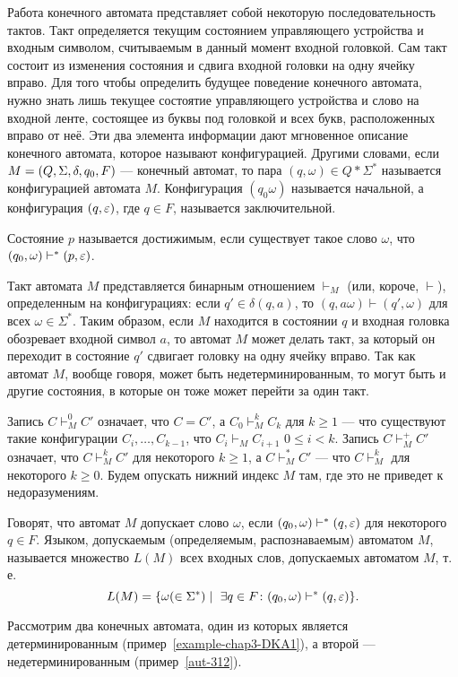 Работа конечного автомата представляет собой некоторую последовательность тактов. Такт определяется текущим состоянием управляющего устройства и входным символом, считываемым в данный момент входной головкой. Сам такт состоит из изменения состояния и сдвига входной головки на одну ячейку вправо. Для того чтобы определить будущее поведение конечного автомата, нужно знать лишь текущее состоятие управляющего устройства и слово на входной ленте, состоящее из буквы под головкой и всех букв, расположенных вправо от неё. Эти два элемента информации дают мгновенное описание конечного автомата, которое называют конфигурацией. Другими словами, если $M = (Q,\\ \Sigma, \delta, q_0, F)$ --- конечный автомат, то пара $(q,\omega)\in Q*\Sigma^*$ называется конфигурацией автомата $M$. Конфигурация $(q_0\omega)$ называется начальной, а конфигурация $(q,\varepsilon)$, где $q\in F$, называется заключительной.

Состояние $p$ называется достижимым, если существует такое слово $\omega$, что $(q_0,\omega)\vdash^*(p,\varepsilon)$.

Такт автомата $M$ представляется бинарным отношением $\vdash_M$ (или, короче, $\vdash$), определенным на конфигурациях: если $q'\in\delta(q,a)$, то $(q,a\omega)\vdash(q',\omega)$ для всех $\omega\in\Sigma^*$. Таким образом, если $M$ находится в состоянии $q$ и входная головка обозревает входной символ $a$, то автомат $M$ может делать такт, за который он переходит в состояние $q'$ сдвигает головку на одну ячейку вправо. Так как автомат $M$, вообще говоря, может быть недетерминированным, то могут быть и другие состояния, в которые он тоже может перейти за один такт.

Запись $C\vdash_M^0 C'$ означает, что $C=C'$, а $C_0\vdash_M^kC_k$ для $k\ge 1$ --- что существуют такие конфигурации $C_i, \ldots ,C_{k-1}$, что $C_i\vdash_MC_{i+1}$ $0\le i<k$. Запись $C\vdash_M^+C'$ означает, что $C\vdash_M^kC'$ для некоторого $k\ge 1$, а $C\vdash_M^*C'$ --- что $C\vdash_M^k$ для некоторого $k\ge 0$. Будем опускать нижний индекс $M$ там, где это не приведет к недоразумениям.

Говорят, что автомат $M$ допускает слово $\omega$, если $(q_0,\omega)\vdash^*(q,\varepsilon)$ для некоторого $q\in F$. Языком, допускаемым (определяемым, распознаваемым) автоматом $M$, называется множество $L(M)$ всех входных слов, допускаемых автоматом $M$, т. е.
\[
	L(M)=\{\omega(\in\Sigma^*)\mid~\exists q\in F\colon (q_0,\omega)\vdash^*(q,\varepsilon)\}.
\]

Рассмотрим два конечных автомата, один из которых является детерминированным (пример~\ref{example-chap3-DKA1}), а второй --- недетерминированным (пример~\ref{aut-312}).

